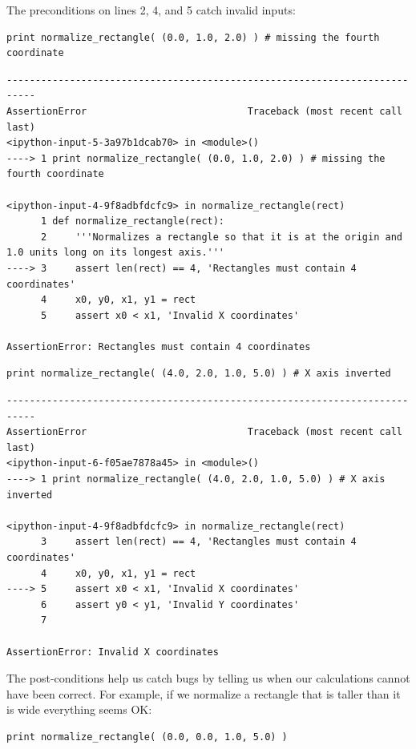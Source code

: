 \documentclass{book}
\begin{document}
The preconditions on lines 2, 4, and 5 catch invalid inputs:

\begin{verbatim}
print normalize_rectangle( (0.0, 1.0, 2.0) ) # missing the fourth coordinate
\end{verbatim}

\begin{verbatim}
---------------------------------------------------------------------------
AssertionError                            Traceback (most recent call last)
<ipython-input-5-3a97b1dcab70> in <module>()
----> 1 print normalize_rectangle( (0.0, 1.0, 2.0) ) # missing the fourth coordinate

<ipython-input-4-9f8adbfdcfc9> in normalize_rectangle(rect)
      1 def normalize_rectangle(rect):
      2     '''Normalizes a rectangle so that it is at the origin and 1.0 units long on its longest axis.'''
----> 3     assert len(rect) == 4, 'Rectangles must contain 4 coordinates'
      4     x0, y0, x1, y1 = rect
      5     assert x0 < x1, 'Invalid X coordinates'

AssertionError: Rectangles must contain 4 coordinates
\end{verbatim}

\begin{verbatim}
print normalize_rectangle( (4.0, 2.0, 1.0, 5.0) ) # X axis inverted
\end{verbatim}

\begin{verbatim}
---------------------------------------------------------------------------
AssertionError                            Traceback (most recent call last)
<ipython-input-6-f05ae7878a45> in <module>()
----> 1 print normalize_rectangle( (4.0, 2.0, 1.0, 5.0) ) # X axis inverted

<ipython-input-4-9f8adbfdcfc9> in normalize_rectangle(rect)
      3     assert len(rect) == 4, 'Rectangles must contain 4 coordinates'
      4     x0, y0, x1, y1 = rect
----> 5     assert x0 < x1, 'Invalid X coordinates'
      6     assert y0 < y1, 'Invalid Y coordinates'
      7

AssertionError: Invalid X coordinates
\end{verbatim}

The post-conditions help us catch bugs by telling us when our
calculations cannot have been correct. For example, if we normalize a
rectangle that is taller than it is wide everything seems OK:

\begin{verbatim}
print normalize_rectangle( (0.0, 0.0, 1.0, 5.0) )
\end{verbatim}
\end{document}
